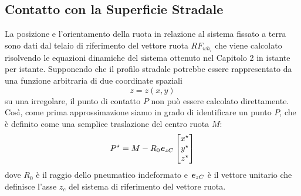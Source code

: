 %
\subsection{Contatto con la Superficie Stradale}
La posizione e l'orientamento della ruota in relazione al sistema fissato a terra sono dati dal telaio di riferimento del vettore ruota $RF_{wh_{i}}$ che viene calcolato risolvendo le equazioni dinamiche del sistema ottenuto nel Capitolo 2 in \cite{Larcher} istante per istante. Supponendo che il profilo stradale potrebbe essere rappresentato da una funzione arbitraria di due coordinate spaziali 
%
\begin{equation}
z=z(x,y)
\end{equation}
%
su una irregolare, il punto di contatto $P$ non può essere calcolato direttamente. Così, come prima approssimazione siamo in grado di identificare un punto $P$, che è definito come una semplice traslazione del centro ruota $M$:
%
\begin{equation}
P^\star = M-R_0\textbf{\textit{e}}_{zC}
\begin{bmatrix}
x^\star\\
y^\star\\
z^\star
\end{bmatrix}
\end{equation}
%
dove $R_0$ è il raggio dello pneumatico indeformato e $\textbf{\textit{e}}_{zC}$ è il vettore unitario che definisce l'asse $z_c$ del sistema di riferimento del vettore ruota.

